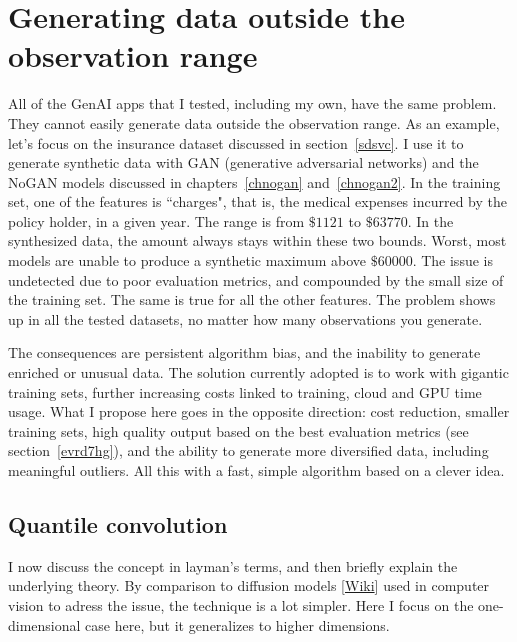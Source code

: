 \documentclass[oneside,10pt]{book}
\begin{document}
\section{Generating data outside the observation range}

All of the GenAI apps that I tested, including my own, have the same problem. They cannot easily generate data outside the observation range.
As an example, let's focus on the insurance dataset discussed in section~\ref{sdsvc}. I use it to generate synthetic data
 with \textcolor{index}{GAN} (generative adversarial networks) and
 the NoGAN models discussed in chapters~\ref{chnogan} and~\ref{chnogan2}. In the
 training set, one of the features
 is ``charges", that is, the medical expenses incurred by the policy holder, in a given year.  The range is from $\$1121$ to  $\$\num{63770}$. In the synthesized data, the amount always stays within these two bounds. Worst, most models are
 unable to produce a synthetic maximum above $\$\num{60000}$. The issue is undetected due to poor evaluation metrics,
 and compounded by the small size of the training set. The same is true for all the other features.  The problem shows up
 in all the tested datasets, no matter how many observations you generate.

The consequences are persistent algorithm bias, and the inability to generate enriched or unusual data. The solution currently adopted is to work
 with gigantic training sets, further increasing costs linked to training, cloud and GPU time usage. What I propose here goes in the opposite direction: cost reduction, smaller training sets, high quality output based on the best evaluation metrics (see section~\ref{evrd7hg}), and the ability
 to generate more diversified data, including meaningful outliers. All this with a fast, simple algorithm based on a clever idea.

\subsection{Quantile convolution}

I now discuss the concept in layman's terms, and then briefly explain the underlying theory. By comparison  to
 \textcolor{index}{diffusion models} [\href{https://en.wikipedia.org/wiki/Diffusion_model}{Wiki}] used in computer vision to adress the issue, the technique is a lot simpler. Here I  focus on the one-dimensional case here, but it generalizes to higher dimensions.
\end{document}
